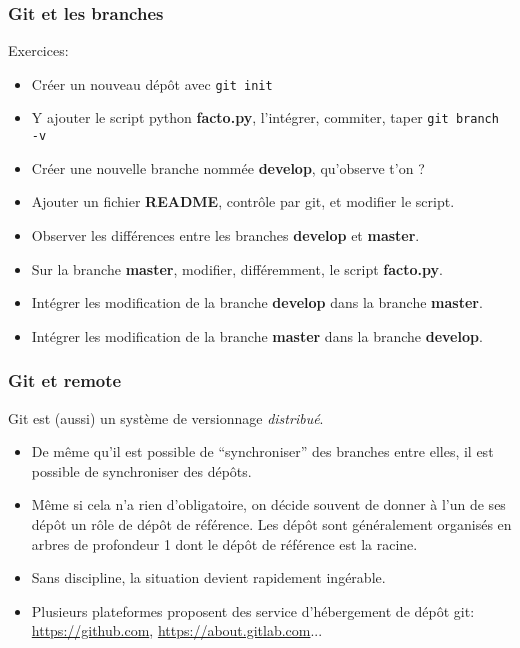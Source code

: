 \documentclass{beamer}
\begin{document}
\begin{frame}[fragile]\frametitle{Git et les branches}
  Exercices:
  \begin{itemize}
  \item Créer un nouveau dépôt avec {\tt git init}
  \item Y ajouter le script python {\bf facto.py}, l'intégrer, commiter, taper {\tt git branch -v}
  \item Créer une nouvelle branche nommée {\bf develop}, qu'observe t'on ?
  \item Ajouter un fichier {\bf README}, contrôle par git, et modifier le script.
  \item Observer les différences entre les branches {\bf develop} et {\bf master}.
  \item Sur la branche {\bf master}, modifier, différemment, le script {\bf facto.py}.
  \item Intégrer les modification de la branche {\bf develop} dans la branche {\bf master}.
  \item Intégrer les modification de la branche {\bf master} dans la branche {\bf develop}.
  \end{itemize}
\end{frame}

\begin{frame}[fragile]\frametitle{Git et remote}
  Git est (aussi) un système de versionnage {\em distribué}.
  \begin{itemize}
    \item De même qu'il est possible de ``synchroniser'' des branches entre elles, il est possible de synchroniser des dépôts.
    \item Même si cela n'a rien d'obligatoire, on décide souvent de donner à l'un de ses dépôt un rôle de dépôt de référence. Les dépôt sont généralement organisés en arbres de profondeur 1 dont le dépôt de référence est la racine.
    \item Sans discipline, la situation devient rapidement ingérable.
    \item Plusieurs plateformes proposent des service d'hébergement de dépôt git: \url{https://github.com}, \url{https://about.gitlab.com}...
  \end{itemize}
\end{frame}
\end{document}
